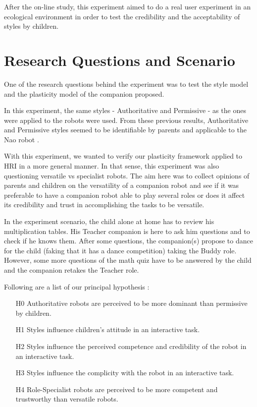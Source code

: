 \documentclass[a4paper,twocolumn]{svjour3}
\begin{document}
After the on-line study, this experiment aimed to do a real user experiment in an ecological environment in order to test the credibility and the acceptability of styles by children. 

\section{Research Questions and Scenario}
\label{sec:research-questions-and-scenario}
One of the research questions behind the experiment was to test the style model and the plasticity model of the companion proposed. 

In this experiment, the same styles - Authoritative and Permissive -  as the ones were applied to the robots were used.
From these previous results, Authoritative and Permissive styles seemed to be identifiable by parents and applicable to the Nao robot \cite{Johal2014}. 

With this experiment, we wanted to verify our plasticity framework applied to HRI in a more general manner. 
In that sense, this experiment was also questioning versatile vs specialist robots. 
The aim here was to collect opinions of parents and children on the versatility of a companion robot and see if it was preferable to have a companion robot able to play several roles or does it affect its credibility and trust in accomplishing the tasks to be versatile.

In the experiment scenario, the child alone at home has to review his multiplication tables. 
His Teacher companion is here to ask him questions and to check if he knows them. 
After some questions, the companion(s) propose to dance for the child (faking that it has a dance competition) taking the Buddy role. 
However, some more questions of the math quiz have to be answered by the child and the companion retakes the Teacher role.


Following are a list of our principal hypothesis :
\begin{itemize}[noitemsep,nolistsep]
	\item[H0] Authoritative robots are perceived to be more dominant than permissive by children.
	\item[H1] Styles influence children's attitude in an interactive task.
	\item[H2] Styles influence the perceived competence and credibility of the robot in an interactive task.
	\item[H3] Styles influence the complicity with the robot in an interactive task.
	\item[H4] Role-Specialist robots are perceived to be more competent and trustworthy than versatile robots.
\end{itemize}
\end{document}
